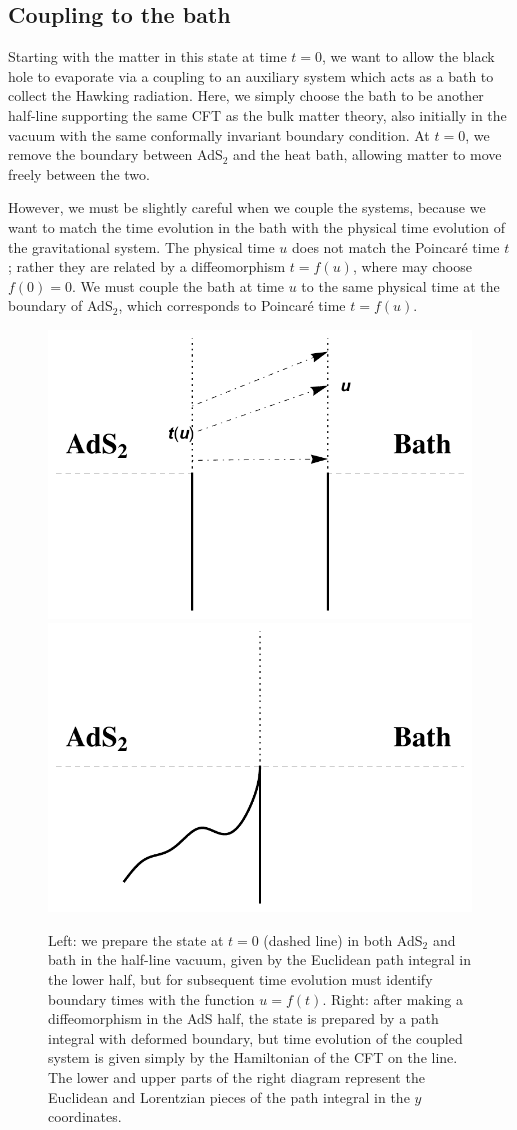 \documentclass[12pt]{article}
\begin{document}
\subsection{Coupling to the bath}

Starting with the matter in this state at time $t=0$, we want to allow the black hole to evaporate via a coupling to an auxiliary system which acts as a bath to collect the Hawking radiation. Here, we simply choose the bath to be another half-line supporting the same CFT as the bulk matter theory, also initially in the vacuum with the same conformally invariant boundary condition. At $t=0$, we remove the boundary between AdS$_2$ and the heat bath, allowing matter to move freely between the two.

However, we must be slightly careful when we couple the systems, because we want to match the time evolution in the bath with the physical time evolution of the gravitational system. The physical time $u$ does not match the Poincar\'e time $t$; rather they are related by a diffeomorphism $t=f(u)$, where may choose $f(0)=0$. We must couple the bath at time $u$ to the same physical time at the boundary of AdS$_2$, which corresponds to Poincar\'e time $t=f(u)$.

\begin{figure}
\centering
\includegraphics[width=.46\textwidth]{AdSBathFig1} \qquad
\includegraphics[width=.46\textwidth]{AdSBathFig2}
	\caption{Left: we prepare the state at $t=0$ (dashed line) in both AdS$_2$ and bath in the half-line vacuum, given by the Euclidean path integral in the lower half, but for subsequent time evolution must identify boundary times with the function $u=f(t)$. Right: after making a diffeomorphism in the AdS half, the state is prepared by a path integral with deformed boundary, but time evolution of the coupled system is given simply by the Hamiltonian of the CFT on the line. The lower and upper parts of the right diagram represent the Euclidean and Lorentzian pieces of the path integral in the $y$ coordinates.\label{fig:AdSBath}}
\end{figure}
\end{document}
